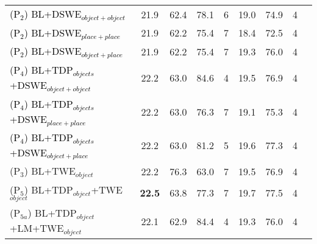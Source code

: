 \documentclass[phd,tocprelim]{cornell}
\begin{document}
\begin{table}
{\begin{tabular}{|l|c c c c|c| c c |c |}
\textcolor{black}{(P$_{2}$) BL+DSWE$_{object+object}$}  &  21.9  &  62.4  &  78.1  & 6  & 19.0 & 74.9 & 4   \\
\textcolor{black}{(P$_{2}$) BL+DSWE$_{place+place}$}   &   21.9  &   62.2 & 75.4 &  7  & 18.4  & 72.5 & 4 \\
\textcolor{black}{(P$_{2}$) BL+DSWE$_{object+place}$}   &   21.9  &  62.2   & 75.4 &  7  & 19.3  & 76.0 & 4 \\

\hline  


\textcolor{black}{(P$_{4}$) BL+TDP$_{objects}$+DSWE$_{object+object}$}       &   22.2   &   63.0 & 84.6 & 4   & 19.5    & 76.9 & 4 \\
 
\textcolor{black}{(P$_{4}$) BL+TDP$_{objects}$+DSWE$_{place+place}$}         &   22.2     &      63.0 &     76.3 &  7 &   19.1  & 75.3 & 4   \\
 
\textcolor{black}{(P$_{4}$) BL+TDP$_{objects}$+DSWE$_{object+place}$}       &   22.2    &   63.0 &  81.2 & 5 & 19.6  & 77.3 &  4  \\ 
 
 
 
 
\hline 
(P$_{3}$) BL+TWE$_{object}$  &   22.2  &  76.3  & 63.0 & 7 & 19.5 & 76.9  & 4  \\ 
(P$_{5}$) BL+TDP$_{object}$+TWE$_{object}$  &   \textbf{22.5}  &   63.8  &  77.3 & 7 & 19.7 & 77.5  & 4  \\ 
(P$_{5a}$) BL+TDP$_{object}$+LM+TWE$_{object}$  &   22.1  &   62.9 &  84.4 & 4 & 19.3  & 76.0  & 4  \\ 
 

 
 


\end{tabular}}
\end{table}
\end{document}
